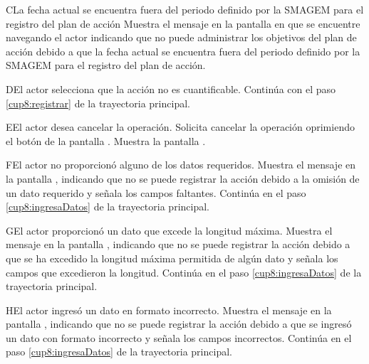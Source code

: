    \begin{UCtrayectoriaA}{C}{La fecha actual se encuentra fuera del periodo definido por la SMAGEM para el registro del plan de acción}
    \UCpaso[\UCsist] Muestra el mensaje  en la pantalla en que se encuentre navegando el actor indicando que no puede administrar los objetivos del plan de acción debido a que la fecha actual se encuentra fuera del periodo definido por la SMAGEM para el registro del plan de acción.
 \end{UCtrayectoriaA}
 

\begin{UCtrayectoriaA}{D}{El actor selecciona que la acción no es cuantificable.}
	\UCpaso[] Continúa con el paso \ref{cup8:registrar} de la trayectoria principal.
\end{UCtrayectoriaA} 

   
\begin{UCtrayectoriaA}{E}{El actor desea cancelar la operación.}
	\UCpaso[\UCactor] Solicita cancelar la operación oprimiendo el botón  de la pantalla .
	\UCpaso[\UCsist] Muestra la pantalla  .
\end{UCtrayectoriaA} 

\begin{UCtrayectoriaA}{F}{El actor no proporcionó alguno de los datos requeridos.}
	\UCpaso[\UCsist] Muestra el mensaje  en la pantalla  ,
	indicando que no se puede registrar la acción debido a la omisión de un dato requerido y señala los campos faltantes.
	\UCpaso[] Continúa en el paso \ref{cup8:ingresaDatos} de la trayectoria principal.
\end{UCtrayectoriaA}
 
\begin{UCtrayectoriaA}{G}{El actor proporcionó un dato que excede la longitud máxima.}
	\UCpaso[\UCsist] Muestra el mensaje  en la pantalla ,
	indicando que no se puede registrar la acción debido a que se ha excedido la longitud máxima permitida de algún dato y señala los campos que excedieron la longitud.
	\UCpaso[] Continúa en el paso \ref{cup8:ingresaDatos} de la trayectoria principal.
\end{UCtrayectoriaA}

\begin{UCtrayectoriaA}{H}{El actor ingresó un dato en formato incorrecto.}
	\UCpaso[\UCsist] Muestra el mensaje  en la pantalla ,
	indicando que no se puede registrar la acción debido a que se ingresó un dato con formato incorrecto y señala los campos incorrectos.
        \UCpaso[] Continúa en el paso \ref{cup8:ingresaDatos} de la trayectoria principal. 
  \end{UCtrayectoriaA}